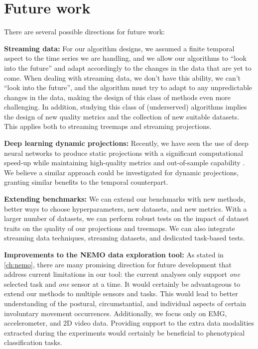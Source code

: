 \section{Future work}

There are several possible directions for future work:

\noindent\textbf{Streaming data:} For our algorithm designs, we assumed a finite temporal aspect to the time series we are handling, and we allow our algorithms to ``look into the future'' and adapt accordingly to the changes in the data that are yet to come. 
When dealing with streaming data, we don't have this ability, we can't ``look into the future'', and the algorithm must try to adapt to any unpredictable changes in the data, making the design of this class of methods even more challenging.
In addition, studying this class of (underserved) algorithms implies the design of new quality metrics and the collection of new suitable datasets. This applies both to streaming treemaps and streaming projections.

\noindent\textbf{Deep learning dynamic projections:} Recently, we have seen the use of deep neural networks to produce static projections with a significant computational speed-up while maintaining high-quality metrics and out-of-sample capability \citep{MateusEspadoto}. We believe a similar approach could be investigated for dynamic projections, granting similar benefits to the temporal counterpart.

\noindent\textbf{Extending benchmarks:} 
We can extend our benchmarks with new methods, better ways to choose hyperparameters, new datasets, and new metrics. With a larger number of datasets, we can perform robust tests on the impact of dataset traits on the quality of our projections and treemaps. We can also integrate streaming data techniques, streaming datasets, and dedicated task-based tests. 

\noindent\textbf{Improvements to the NEMO data exploration tool:} 
As stated in \cref{ch:nemo}, there are many promising direction for future development that address current limitations in our tool: the current analyses only support \emph{one} selected task and \emph{one} sensor at a time. It would certainly be advantageous to extend our methods to multiple sensors and tasks. This would lead to better understanding of the postural, circumstantial,  and individual aspects of certain involuntary movement occurrences.
Additionally, we focus only on EMG, accelerometer, and 2D video data. Providing support to the extra data modalities extracted during the experiments would certainly be beneficial to phenotypical classification tasks.

